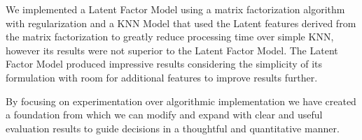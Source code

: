 \documentclass[10pt]{article}
\begin{document}
We implemented a Latent Factor Model using a matrix factorization algorithm with regularization and a KNN Model that used the Latent features derived from the matrix factorization to greatly reduce processing time over simple KNN, however its results were not superior to the Latent Factor Model. The Latent Factor Model produced impressive results considering the simplicity of its formulation with room for additional features to improve results further.

By focusing on experimentation over algorithmic implementation we have created a foundation from which we can modify and expand with clear and useful evaluation results to guide decisions in a thoughtful and quantitative manner.

%



\end{document}
